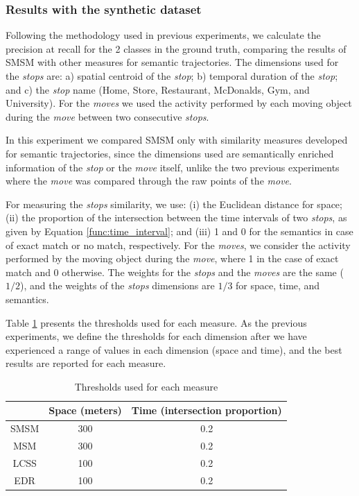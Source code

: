 \documentclass[12pt]{article}
\begin{document}
\subsubsection{Results with the synthetic dataset}
Following the methodology used in previous experiments, we calculate the precision at recall for the 2 classes in the ground truth, comparing the results of SMSM with other measures for semantic trajectories. The dimensions used for the \emph{stops} are: a) spatial centroid of the \emph{stop}; b) temporal duration of the \emph{stop}; and c) the \emph{stop} name (Home, Store, Restaurant, McDonalds, Gym, and University). For the \emph{moves} we used the activity performed by each moving object during the \emph{move} between two consecutive \emph{stops}.

In this experiment we compared SMSM only with similarity measures developed for semantic trajectories, since the dimensions used are semantically enriched information of the \emph{stop} or the \emph{move} itself, unlike the two previous experiments where the \emph{move} was compared through the raw points of the \emph{move}.

For measuring the \emph{stops} similarity, we use: (i) the Euclidean distance for space; (ii) the proportion of the intersection between the time intervals of two \emph{stops}, as given by Equation \ref{func:time_interval}; and (iii) 1 and 0 for the semantics in case of exact match or no match, respectively. For the \emph{moves}, we consider the activity performed by the moving object during the \emph{move}, where 1 in the case of exact match and 0 otherwise. The weights for the \emph{stops} and the \emph{moves} are the same ($1/2$), and the weights of the \emph{stops} dimensions are $1/3$ for space, time, and semantics.

Table \ref{tab:hermoupolis_thresholds} presents the thresholds used for each measure. As the previous experiments, we define the thresholds for each dimension after we have experienced a range of values in each dimension (space and time), and the best results are reported for each measure.

\begin{table}[!h]
\scriptsize
  \centering
  \begin{tabular}{|c|c|c|}
  	\hline
  & Space (meters) & Time (intersection proportion) \\
  	\hline
 SMSM & 300 & 0.2 \\
 MSM & 300 & 0.2 \\
 LCSS & 100 & 0.2 \\
 EDR & 100 & 0.2 \\
    \hline
  \end{tabular}
  \caption{Thresholds used for each measure}
  \label{tab:hermoupolis_thresholds}
\end{table}
\end{document}
